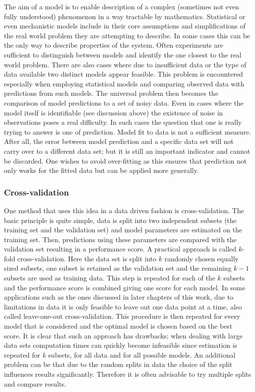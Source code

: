 The aim of a model is to enable description of a complex (sometimes not even fully understood) phenomenon in a way tractable by mathematics. Statistical or even mechanistic models include in their core assumptions and simplifications of the real world problem they are attempting to describe. In some cases this can be the only way to describe properties of the system. Often experiments are sufficient to distinguish between models and identify the one closest to the real world problem. There are also cases where due to insufficient data or the type of data available two distinct models appear feasible. This problem is encountered especially when employing statistical models and comparing observed data with predictions from such models. The universal problem then becomes the comparison of model predictions to a set of noisy data. Even in cases where the model itself is identifiable (see discussion above) the existence of noise in observations poses a real difficulty. In such cases the question that one is really trying to answer is one of prediction. Model fit to data is not a sufficient measure. After all, the error between model prediction and a specific data set will not carry over to a different data set; but it is still an important indicator and cannot be discarded.  One wishes to avoid over-fitting as this ensures that prediction not only works for the fitted data but can be applied more generally.

\subsubsection{Cross-validation}
\label{sec:cross-validation}

One method that uses this idea in a data driven fashion is cross-validation. The basic principle is quite simple, data  is split into two independent subsets (the training set and the validation set) and model parameters are estimated on the training set. Then, predictions using these parameters are compared with the validation set resulting in a performance score. A practical approach is called $k$-fold cross-validation. Here the data set is split into $k$ randomly chosen equally sized subsets, one subset is retained as the validation set and the remaining $k-1$ subsets are used as training data. This step is repeated for each of the $k$ subsets and the performance score is combined giving one score for each model. In some applications such as the ones discussed in later chapters of this work, due to limitations in data it is only feasible to leave out one data point at a time, also called leave-one-out cross-validation. This procedure is then repeated for every model that is considered and the optimal model is chosen based on the best score. It is clear that such an approach has drawbacks; when dealing with large data sets computation times can quickly become infeasible since estimation is repeated for $k$ subsets, for all data and for all possible models. An additional problem can be that due to the random splits in data the choice of the split influences results significantly. Therefore it is often advisable to try multiple splits and compare results.

